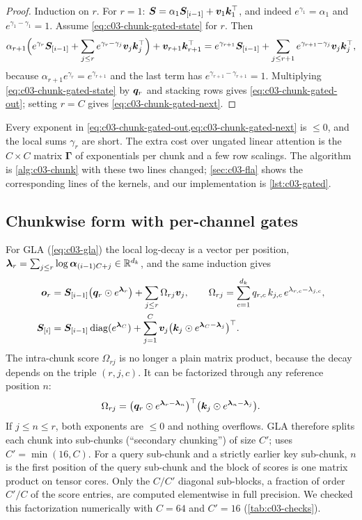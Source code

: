 \begin{proof}
Induction on $r$. For $r=1$: $\bm{S}=\alpha_1\bm{S}_{[i-1]}+\bm{v}_1\bm{k}_1^{\top}$, and indeed
$e^{\gamma_1}=\alpha_1$ and $e^{\gamma_1-\gamma_1}=1$. Assume
\cref{eq:c03-chunk-gated-state} for $r$. Then
\[
  \alpha_{r+1}\Big(e^{\gamma_r}\bm{S}_{[i-1]}+\sum_{j\le r}e^{\gamma_r-\gamma_j}\bm{v}_j\bm{k}_j^{\top}\Big)
  +\bm{v}_{r+1}\bm{k}_{r+1}^{\top}
  =e^{\gamma_{r+1}}\bm{S}_{[i-1]}+\sum_{j\le r+1}e^{\gamma_{r+1}-\gamma_j}\bm{v}_j\bm{k}_j^{\top},
\]
because $\alpha_{r+1}e^{\gamma_r}=e^{\gamma_{r+1}}$ and the last term has
$e^{\gamma_{r+1}-\gamma_{r+1}}=1$. Multiplying \cref{eq:c03-chunk-gated-state} by $\bm{q}_r$ and
stacking rows gives \cref{eq:c03-chunk-gated-out}; setting $r=C$ gives
\cref{eq:c03-chunk-gated-next}.
\end{proof}

Every exponent in \cref{eq:c03-chunk-gated-out,eq:c03-chunk-gated-next} is $\le0$, and the local
sums $\gamma_r$ are short. The extra cost over ungated linear attention is the $C\times C$ matrix
$\bm{\Gamma}$ of exponentials per chunk and a few row scalings. The algorithm is
\cref{alg:c03-chunk} with these two lines changed; \cref{sec:c03-fla} shows the corresponding
lines of the \fla{} kernels, and our implementation is \cref{lst:c03-gated}.

\subsection{Chunkwise form with per-channel gates}

For GLA (\cref{eq:c03-gla}) the local log-decay is a vector per position,
$\bm{\lambda}_r=\sum_{j\le r}\log\bm{\alpha}_{(i-1)C+j}\in\mathbb{R}^{d_k}$, and the same induction gives
\begin{align*}
  \bm{o}_r&=\bm{S}_{[i-1]}\big(\bm{q}_r\odot e^{\bm{\lambda}_r}\big)
  +\sum_{j\le r}\Omega_{rj}\bm{v}_j,\qquad
  \Omega_{rj}=\sum_{c=1}^{d_k}q_{r,c}\,k_{j,c}\,e^{\lambda_{r,c}-\lambda_{j,c}},\\
  \bm{S}_{[i]}&=\bm{S}_{[i-1]}\operatorname{diag}(e^{\bm{\lambda}_C})+\sum_{j=1}^{C}\bm{v}_j\big(\bm{k}_j\odot e^{\bm{\lambda}_C-\bm{\lambda}_j}\big)^{\top} .
\end{align*}
The intra-chunk score $\Omega_{rj}$ is no longer a plain matrix product, because the decay depends on
the triple $(r,j,c)$. It can be factorized through any reference position $n$:
\[
  \Omega_{rj}=\big(\bm{q}_r\odot e^{\bm{\lambda}_r-\bm{\lambda}_n}\big)^{\top}\big(\bm{k}_j\odot e^{\bm{\lambda}_n-\bm{\lambda}_j}\big).
\]
If $j\le n\le r$, both exponents are $\le0$ and nothing overflows. GLA therefore splits each
chunk into sub-chunks (``secondary chunking'') of size $C'$; \fla{} uses $C'=\min(16,C)$. For a
query sub-chunk and a strictly earlier key sub-chunk, $n$ is the first position of the query
sub-chunk and the block of scores is one matrix product on tensor cores. Only the $C/C'$
diagonal sub-blocks, a fraction of order $C'/C$ of the score entries, are computed elementwise in
full precision.
We checked this factorization numerically with $C=64$ and $C'=16$ (\cref{tab:c03-checks}).

